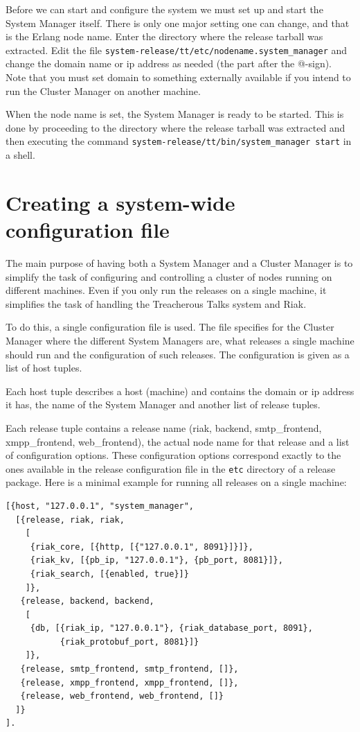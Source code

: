 \documentclass[11pt,a4paper]{report}
\begin{document}
\begin{sloppypar}
Before we can start and configure the system we must set up and start the System
Manager itself. There is only one major setting one can change, and that is the
Erlang node name. Enter the directory where the release tarball was extracted.
Edit the file {\tt system-release/tt/etc/nodename.system\_manager} and change
the domain name or ip address as needed (the part after the @-sign). Note that
you must set domain to something externally available if you intend to run the
Cluster Manager on another machine.
\end{sloppypar}

\begin{sloppypar}
When the node name is set, the System Manager is ready to be started. This is
done by proceeding to the directory where the release tarball was extracted and
then executing the command {\tt system-release/tt/bin/system\_manager start} in
a shell.
\end{sloppypar}
\section{Creating a system-wide configuration file}
The main purpose of having both a System Manager and a Cluster Manager is to
simplify the task of configuring and controlling a cluster of nodes running on
different machines. Even if you only run the releases on a single machine, it
simplifies the task of handling the Treacherous Talks system and Riak.

To do this, a single configuration file is used. The file specifies for the
Cluster Manager where the different System Managers are, what releases a single
machine should run and the configuration of such releases. The configuration is
given as a list of host tuples.

Each host tuple describes a host (machine) and contains the domain or ip address
it has, the name of the System Manager and another list of release tuples.

Each release tuple contains a release name (riak, backend, smtp\_frontend,
xmpp\_frontend, web\_frontend), the actual node name for that release and a list
of configuration options. These configuration options correspond exactly to the
ones available in the release configuration file in the {\tt etc} directory of a
release package. Here is a minimal example for running all releases on a single
machine:

\begin{Verbatim}[samepage=true]
[{host, "127.0.0.1", "system_manager",
  [{release, riak, riak,
    [
     {riak_core, [{http, [{"127.0.0.1", 8091}]}]},
     {riak_kv, [{pb_ip, "127.0.0.1"}, {pb_port, 8081}]},
     {riak_search, [{enabled, true}]}
    ]},
   {release, backend, backend,
    [
     {db, [{riak_ip, "127.0.0.1"}, {riak_database_port, 8091},
           {riak_protobuf_port, 8081}]}
    ]},
   {release, smtp_frontend, smtp_frontend, []},
   {release, xmpp_frontend, xmpp_frontend, []},
   {release, web_frontend, web_frontend, []}
  ]}
].
\end{Verbatim}
\end{document}
